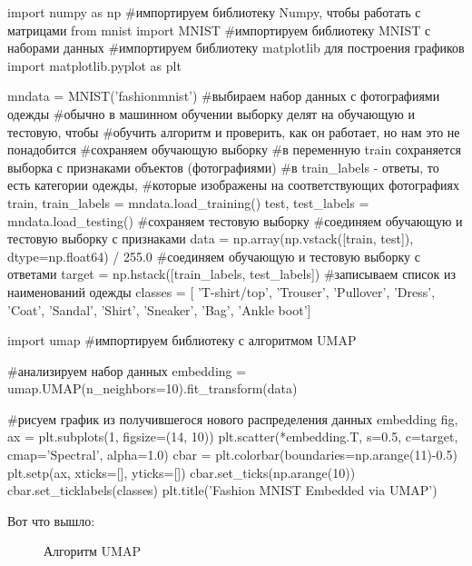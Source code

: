 \begin{itemize}
	\begin{listing}[1]{1}
import numpy as np #импортируем библиотеку Numpy, чтобы работать с матрицами
from mnist import MNIST #импортируем библиотеку MNIST с наборами данных
#импортируем библиотеку matplotlib для построения графиков
import matplotlib.pyplot as plt
		
mndata = MNIST('fashionmnist') #выбираем набор данных с фотографиями одежды
#обычно в машинном обучении выборку делят на обучающую и тестовую, чтобы
#обучить алгоритм и проверить, как он работает, но нам это не понадобится
#сохраняем обучающую выборку
#в переменную train сохраняется выборка с признаками объектов (фотографиями)
#в train_labels - ответы, то есть категории одежды,
#которые изображены на соответствующих фотографиях
train, train_labels = mndata.load_training() 
test, test_labels = mndata.load_testing() #сохраняем тестовую выборку
#соединяем обучающую и тестовую выборку с признаками
data = np.array(np.vstack([train, test]), dtype=np.float64) / 255.0
#соединяем обучающую и тестовую выборку с ответами
target = np.hstack([train_labels, test_labels])
#записываем список из наименований одежды
classes = [
	'T-shirt/top',
	'Trouser',
	'Pullover',
	'Dress',
	'Coat',
	'Sandal',
	'Shirt',
	'Sneaker',
	'Bag',
	'Ankle boot']
			
import umap #импортируем библиотеку с алгоритмом UMAP

#анализируем набор данных
embedding = umap.UMAP(n_neighbors=10).fit_transform(data)
		
#рисуем график из получившегося нового распределения данных embedding
fig, ax = plt.subplots(1, figsize=(14, 10))
plt.scatter(*embedding.T, s=0.5, c=target, cmap='Spectral', alpha=1.0)
cbar = plt.colorbar(boundaries=np.arange(11)-0.5)
plt.setp(ax, xticks=[], yticks=[])
cbar.set_ticks(np.arange(10))
cbar.set_ticklabels(classes)
plt.title('Fashion MNIST Embedded via UMAP')
	\end{listing}

Вот что вышло:

\begin{figure}[bh]
	\noindent{}
	\caption{Алгоритм UMAP}
	\label{figCurves}
\end{figure}


\end{itemize}
